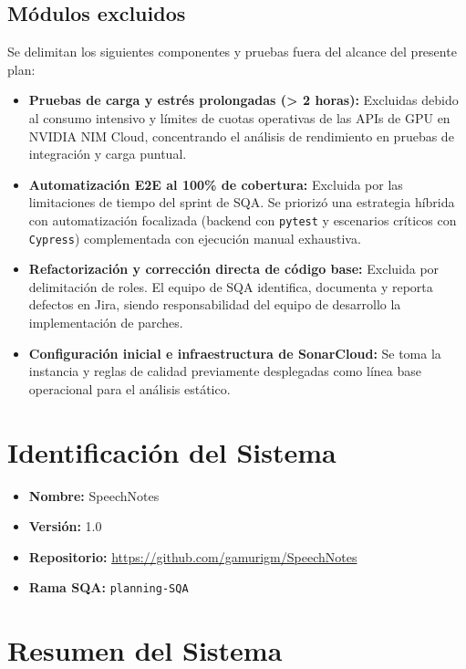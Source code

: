 \subsection{Módulos excluidos}
\label{subsec:modulos-excluidos}

Se delimitan los siguientes componentes y pruebas fuera del alcance del presente plan:

\begin{itemize}
    \item \textbf{Pruebas de carga y estrés prolongadas (> 2 horas):} Excluidas debido al consumo intensivo y límites de cuotas operativas de las APIs de GPU en NVIDIA NIM Cloud, concentrando el análisis de rendimiento en pruebas de integración y carga puntual.
    \item \textbf{Automatización E2E al 100\% de cobertura:} Excluida por las limitaciones de tiempo del sprint de SQA. Se priorizó una estrategia híbrida con automatización focalizada (backend con \texttt{pytest} y escenarios críticos con \texttt{Cypress}) complementada con ejecución manual exhaustiva.
    \item \textbf{Refactorización y corrección directa de código base:} Excluida por delimitación de roles. El equipo de SQA identifica, documenta y reporta defectos en Jira, siendo responsabilidad del equipo de desarrollo la implementación de parches.
    \item \textbf{Configuración inicial e infraestructura de SonarCloud:} Se toma la instancia y reglas de calidad previamente desplegadas como línea base operacional para el análisis estático.
\end{itemize}

\section{Identificación del Sistema}
\label{sec:identificacion}

\begin{itemize}
    \item \textbf{Nombre:} SpeechNotes
    \item \textbf{Versión:} 1.0
    \item \textbf{Repositorio:} \url{https://github.com/gamurigm/SpeechNotes}
    \item \textbf{Rama SQA:} \texttt{planning-SQA}
\end{itemize}

\section{Resumen del Sistema}
\label{sec:resumen}

